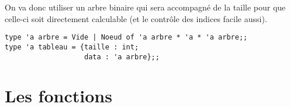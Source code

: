 On va donc utiliser un arbre binaire qui sera accompagné de la taille pour que celle-ci soit directement calculable (et le contrôle des indices facile aussi).

\begin{lstlisting}
type 'a arbre = Vide | Noeud of 'a arbre * 'a * 'a arbre;;
type 'a tableau = {taille : int;
                   data : 'a arbre};;
\end{lstlisting}
\section{Les fonctions}
